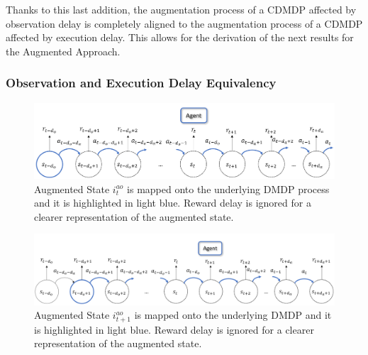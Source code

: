                 Thanks to this last addition, the augmentation process of a CDMDP affected by observation delay is completely aligned to the augmentation process of a CDMDP affected by execution delay. This allows for the derivation of the next results for the Augmented Approach.
            
            \subsubsection{Observation and Execution Delay Equivalency}
                \label{subsubs:delayeq}
                \begin{figure}[!t]
                    \centering
                    \includegraphics[width=15cm, keepaspectratio]{images/dmdp/augmented_i_ao.png}
                    \caption{Augmented State $i_t^{ao}$ is mapped onto the underlying DMDP process and it is highlighted in light blue. Reward delay is ignored for a clearer representation of the augmented state.}
                    \label{fig:augmented_i_ao}
                \end{figure}
                \begin{figure}[!t]
                    \centering
                    \includegraphics[width=15cm, keepaspectratio]{images/dmdp/augmented_i_ao_next.png}
                    \caption{Augmented State $i_{t+1}^{ao}$ is mapped onto the underlying DMDP and it is highlighted in light blue. Reward delay is ignored for a clearer representation of the augmented state.}
                    \label{fig:augmented_i_ao_next}
                \end{figure}
                
